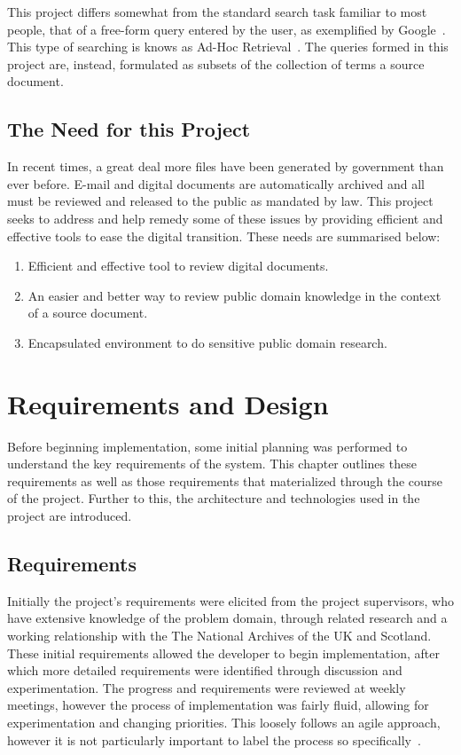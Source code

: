 \documentclass{l4proj}
\begin{document}
This project differs somewhat from the standard search task familiar to most people, that of a free-form query entered by the user, as exemplified by Google~\cite{google}. This type of searching is knows as Ad-Hoc Retrieval~\cite{baeza1999modern}. The queries formed in this project are, instead, formulated as subsets of the collection of terms a source document.
\section{The Need for this Project}
In recent times, a great deal more files have been generated by government than ever before. E-mail and digital documents are automatically archived and all must be reviewed and released to the public as mandated by law.
This project seeks to address and help remedy some of these issues by providing efficient and effective tools to ease the digital transition.
These needs are summarised below:
\begin{center}
\begin{enumerate}[label=\textbf{Need.\arabic*}]
\item Efficient and effective tool to review digital documents.
\item An easier and better way to review public domain knowledge in the context of a source document.
\item Encapsulated environment to do sensitive public domain research.
\end{enumerate}
\end{center}

\chapter{Requirements and Design} \label{requirementsanddesign}
Before beginning implementation, some initial planning was performed to understand the key requirements of the system. This chapter outlines these requirements as well as those requirements that materialized through the course of the project. Further to this, the architecture and technologies used in the project are introduced.
\section{Requirements}
Initially the project's requirements were elicited from the project supervisors, who have extensive knowledge of the problem domain, through related research and a working relationship with the The National Archives of the UK and Scotland.
These initial requirements allowed the developer to begin implementation, after which more detailed requirements were identified through discussion and experimentation. The progress and requirements were reviewed at weekly meetings, however the process of implementation was fairly fluid, allowing for experimentation and changing priorities. This loosely follows an agile approach, however it is not particularly important to label the process so specifically~\cite{Sommerville:2010:SE:1841764}.
\end{document}
